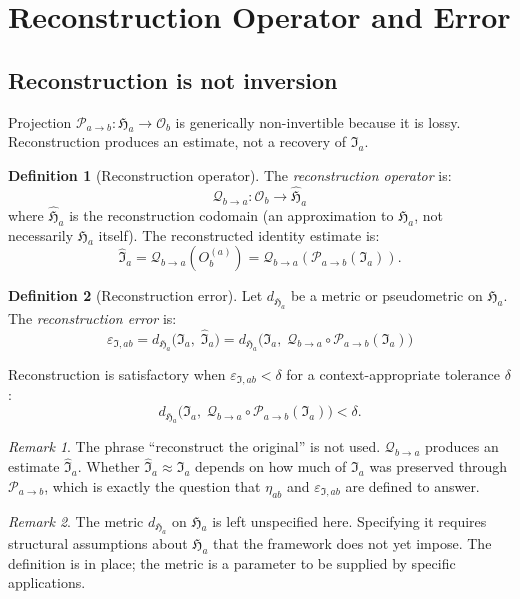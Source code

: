 \documentclass[12pt, a4paper]{article}
\theoremstyle{definition}
\newtheorem{defn}{Definition}[section]
\theoremstyle{plain}
\theoremstyle{remark}
\newtheorem{remark}{Remark}[section]
\newcommand{\Ia}{\mathfrak{I}_a}
\newcommand{\Ihat}{\widehat{\mathfrak{I}}_a}
\newcommand{\Ha}{\mathfrak{H}_a}        %
\newcommand{\Hahat}{\widehat{\mathfrak{H}}_a}  %
\newcommand{\Osp}{\mathcal{O}_b}        %
\newcommand{\Pab}{\mathcal{P}_{a\to b}}
\newcommand{\Qba}{\mathcal{Q}_{b\to a}}   %
\newcommand{\Oba}{O_b^{(a)}}
\newcommand{\etaab}{\eta_{ab}}
\newcommand{\epsI}{\varepsilon_{\mathfrak{I},ab}}
\newcommand{\dHa}{d_{\Ha}}
\begin{document}
\section{Reconstruction Operator and Error}
\label{sec:recon}

\subsection{Reconstruction is not inversion}

Projection $\Pab : \Ha \to \Osp$ is generically non-invertible
because it is lossy.
Reconstruction produces an estimate, not a recovery of $\Ia$.

\begin{defn}[Reconstruction operator]
\label{def:Qba}
The \emph{reconstruction operator} is:
\[
  \boxed{\Qba : \Osp \to \Hahat}
\]
where $\Hahat$ is the reconstruction codomain (an approximation to
$\Ha$, not necessarily $\Ha$ itself).
The reconstructed identity estimate is:
\[
  \Ihat = \Qba(\Oba) = \Qba(\Pab(\Ia)).
\]
\end{defn}

\begin{defn}[Reconstruction error]
\label{def:reconerror}
Let $\dHa$ be a metric or pseudometric on $\Ha$.
The \emph{reconstruction error} is:
\[
  \boxed{
    \epsI = \dHa\!\bigl(\Ia,\;\Ihat\bigr)
    = \dHa\!\bigl(\Ia,\;\Qba\circ\Pab(\Ia)\bigr)
  }
\]
\end{defn}

Reconstruction is satisfactory when $\epsI < \delta$ for a
context-appropriate tolerance $\delta$:
\[
  \dHa\!\bigl(\Ia,\;\Qba\circ\Pab(\Ia)\bigr) < \delta.
\]

\begin{remark}
The phrase ``reconstruct the original'' is not used.
$\Qba$ produces an estimate $\Ihat$.
Whether $\Ihat \approx \Ia$ depends on how much of $\Ia$ was
preserved through $\Pab$, which is exactly the question that
$\etaab$ and $\epsI$ are defined to answer.
\end{remark}

\begin{remark}
The metric $\dHa$ on $\Ha$ is left unspecified here.
Specifying it requires structural assumptions about $\Ha$ that
the framework does not yet impose.
The definition is in place; the metric is a parameter to be
supplied by specific applications.
\end{remark}
\end{document}
